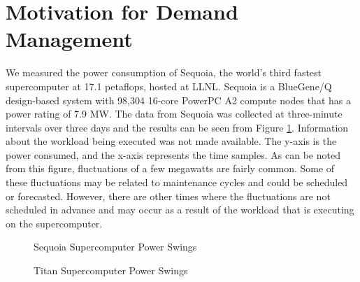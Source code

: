 \section{Motivation for Demand Management}
\label{strategies}
We measured the power consumption of Sequoia, the world's third fastest supercomputer at 17.1 petaflops, hosted at LLNL. Sequoia is a BlueGene/Q design-based system with 98,304 16-core PowerPC A2 compute nodes that has a power rating of 7.9 MW. The data from Sequoia was collected at three-minute intervals over three days and the results can be seen from Figure \ref{fig:seq}. Information about the workload being executed was not made available. The y-axis is the power consumed, and the x-axis represents the time samples.  As can be noted from this figure, fluctuations of a few megawatts are fairly common. Some of these fluctuations may be related to maintenance cycles and could be scheduled or forecasted. However, there are other times where the fluctuations are not scheduled in advance and may occur as a result of the workload that is executing on the supercomputer. 

\begin{figure}
\begin{center}
\caption{Sequoia Supercomputer Power Swings}
\label{fig:seq}
\end{center}
\end{figure}

\begin{figure}
\begin{center}
\caption{Titan Supercomputer Power Swings}
\label{fig:titan}
\end{center}
\end{figure}

